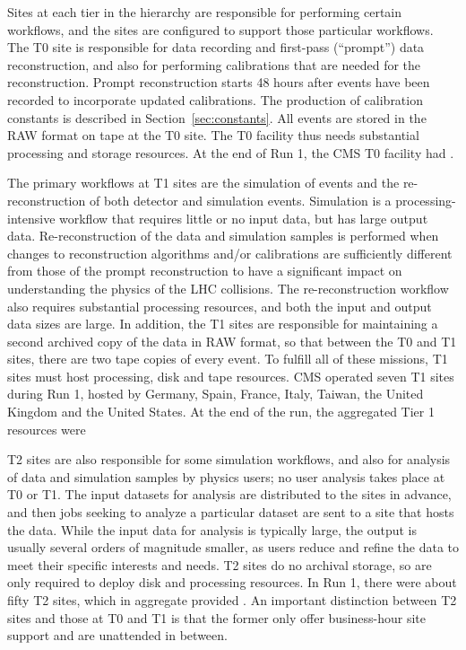 Sites at each tier in the hierarchy are responsible for performing certain
workflows, and the sites are configured to support those particular
workflows.    The T0 site is responsible for data recording
and first-pass (``prompt'') data reconstruction, and also for performing
calibrations that are needed for the reconstruction.  Prompt reconstruction
starts 48 hours after events have been recorded to incorporate updated
calibrations.  The production of calibration constants is described in
Section~\ref{sec:constants}.  All events are stored in the RAW format on
tape at the T0 site.    The T0 facility thus
needs substantial processing and storage resources.  At the end of Run 1,
the CMS T0 facility had .

The primary workflows at T1 sites are the simulation of events and the
re-reconstruction of both detector and simulation events.  Simulation is a
processing-intensive workflow that requires little or no input data, but
has large output data.  Re-reconstruction of the data and simulation
samples is performed when changes to reconstruction algorithms and/or
calibrations are sufficiently different from those of the prompt
reconstruction to have a significant impact on understanding the physics of
the LHC collisions.  The re-reconstruction workflow also requires
substantial processing resources, and both the input and output data sizes
are large.  In addition, the T1 sites are responsible for maintaining a
second archived copy of the data in RAW format, so that between the T0 and
T1 sites, there are two tape copies of every event.  To fulfill all of
these missions, T1 sites must host processing, disk and tape resources.
CMS operated seven T1 sites during Run 1, hosted by Germany, Spain, France,
Italy, Taiwan, the United Kingdom and the United States.  At the end of the
run, the aggregated Tier 1 resources were 

T2 sites are also responsible for some simulation workflows, and also for
analysis of data and simulation samples by physics users; no user analysis
takes place at T0 or T1.  The input datasets for analysis are distributed
to the sites in advance, and then jobs seeking to analyze a particular
dataset are sent to a site that hosts the data.  While the input data for
analysis is typically large, the output is usually several orders of
magnitude smaller, as users reduce and refine the data to meet their
specific interests and needs.    T2 sites do no archival
storage, so are only required to deploy disk and processing resources.  In
Run 1, there were about fifty T2 sites, which in aggregate provided
.  An important distinction between T2
sites and those at T0 and T1 is that the former only offer business-hour
site support and are unattended in between.

